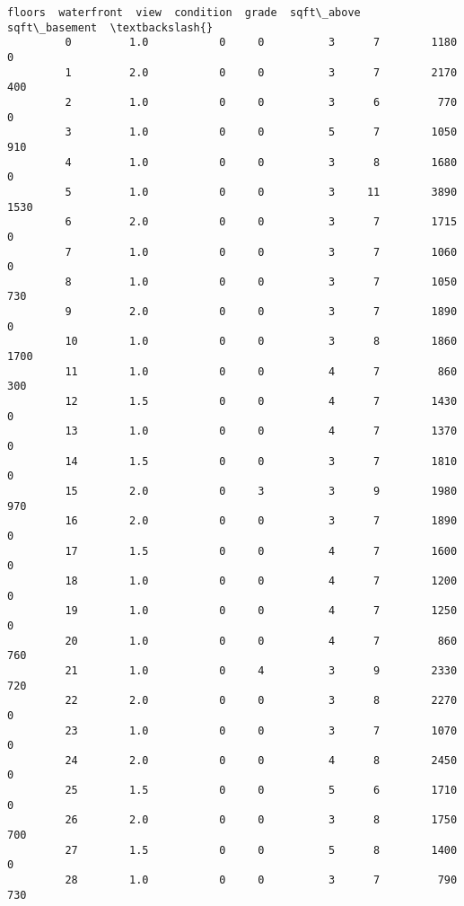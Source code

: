 \documentclass[11pt]{article}
\begin{document}
\begin{Verbatim}[commandchars=\\\{\}]
                floors  waterfront  view  condition  grade  sqft\_above  sqft\_basement  \textbackslash{}
         0         1.0           0     0          3      7        1180              0   
         1         2.0           0     0          3      7        2170            400   
         2         1.0           0     0          3      6         770              0   
         3         1.0           0     0          5      7        1050            910   
         4         1.0           0     0          3      8        1680              0   
         5         1.0           0     0          3     11        3890           1530   
         6         2.0           0     0          3      7        1715              0   
         7         1.0           0     0          3      7        1060              0   
         8         1.0           0     0          3      7        1050            730   
         9         2.0           0     0          3      7        1890              0   
         10        1.0           0     0          3      8        1860           1700   
         11        1.0           0     0          4      7         860            300   
         12        1.5           0     0          4      7        1430              0   
         13        1.0           0     0          4      7        1370              0   
         14        1.5           0     0          3      7        1810              0   
         15        2.0           0     3          3      9        1980            970   
         16        2.0           0     0          3      7        1890              0   
         17        1.5           0     0          4      7        1600              0   
         18        1.0           0     0          4      7        1200              0   
         19        1.0           0     0          4      7        1250              0   
         20        1.0           0     0          4      7         860            760   
         21        1.0           0     4          3      9        2330            720   
         22        2.0           0     0          3      8        2270              0   
         23        1.0           0     0          3      7        1070              0   
         24        2.0           0     0          4      8        2450              0   
         25        1.5           0     0          5      6        1710              0   
         26        2.0           0     0          3      8        1750            700   
         27        1.5           0     0          5      8        1400              0   
         28        1.0           0     0          3      7         790            730   

\end{Verbatim}
\end{document}
